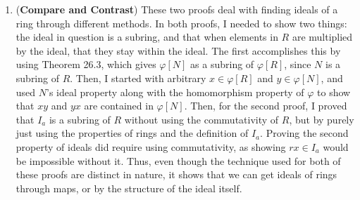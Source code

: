 \begin{enumerate}[label=\textbf{\arabic*.}]
    \begin{problem}
        Find the degree and basis for the field extension \(\Q(\sqrt{2}, \sqrt[3]{2})\) over \(\Q\).
    \end{problem}
    \newpage

    \item (\textbf{Compare and Contrast}) These two proofs deal with finding ideals of a ring through different methods. In both proofs, I needed to show two things: the ideal in question is a subring, and that when elements in \(R\) are multiplied by the ideal, that they stay within the ideal. The first accomplishes this by using Theorem 26.3, which gives \(\varphi[N]\) as a subring of \(\varphi[R]\), since \(N\) is a subring of \(R\). Then, I started with arbitrary \(x \in \varphi[R]\) and \(y \in \varphi[N]\), and used \(N\)'s ideal property along with the homomorphism property of \(\varphi\) to show that \(xy\) and \(yx\) are contained in \(\varphi[N]\). Then, for the second proof, I proved that \(I_{a}\) is a subring of \(R\) without using the commutativity of \(R\), but by purely just using the properties of rings and the definition of \(I_{a}\). Proving the second property of ideals did require using commutativity, as showing \(rx \in I_{a}\) would be impossible without it. Thus, even though the technique used for both of these proofs are distinct in nature, it shows that we can get ideals of rings through maps, or by the structure of the ideal itself.


\end{enumerate}
